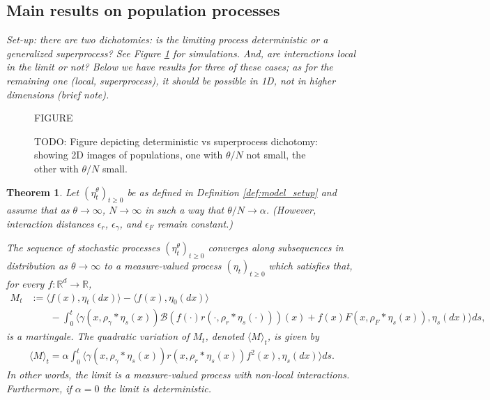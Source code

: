 \documentclass[12pt]{article}
\newtheorem{theorem}{Theorem}[section]
\newcommand{\kernel}{\rho}  %
\newcommand{\smooth}[1]{\kernel_{#1} \! * \!}  %
\newcommand{\comment}[1]{{\color{blue} \it #1}}
\begin{document}
\subsection{Main results on population processes}

\comment{
Set-up: there are two dichotomies:
is the limiting process deterministic or a generalized superprocess?
See Figure \ref{fig:super_vs_det_2d} for simulations.
And, are interactions local in the limit or not?
Below we have results for three of these cases;
as for the remaining one (local, superprocess),
it should be possible in 1D, not in higher dimensions (brief note).
}


\begin{figure}
    \begin{center}
        FIGURE
    \end{center}
    \caption{
        TODO: Figure depicting deterministic vs superprocess dichotomy:
        showing 2D images of populations,
        one with $\theta/N$ not small, the other with $\theta/N$ small.
        \label{fig:super_vs_det_2d}
    }
\end{figure}

\begin{theorem} \label{thm:nonlocal_convergence}
    Let $(\eta^\theta_t)_{t \geq 0}$
    be as defined in Definition \ref{def:model_setup}
    and assume that as $\theta \to \infty$, $N \to \infty$
    in such a way that $\theta/N \to \alpha$.
    (However, interaction distances $\epsilon_r$, $\epsilon_\gamma$, and $\epsilon_F$
    remain constant.)

    The sequence of stochastic processes
    $(\eta^\theta_t)_{t \geq 0}$
    converges along subsequences in distribution as $\theta \to \infty$
    to a measure-valued process $(\eta_t)_{t \geq 0}$
    which satisfies that, for every $f:\mathbb{R}^d \rightarrow \mathbb{R}$,
    \begin{align} \label{eqn:mgale_problem}
        M_t
        &:=
        \langle f(x), \eta_t(dx) \rangle
        -
        \langle f(x), \eta_0(dx) \rangle
        \\ & \qquad
        -
        \int_0^t \big\langle
            \gamma(x, \smooth{\gamma} \eta_{s}(x))
            \mathcal{B}\left(
                f(\cdot) r(\cdot, \smooth{r} \eta_{s}(\cdot))
            \right)(x)
            +
            f(x)
            F(x, \smooth{F} \eta_{s}(x)),
            \eta_{s}(dx)
        \big\rangle ds,
    \end{align}
    is a martingale.
    The quadratic variation of $M_t$, denoted $\langle M \rangle_t$, is given by 
    \begin{align} \label{eqn:mgale_variation}
        \langle M \rangle_t
        =
        \alpha
        \int_0^t
        \big\langle
            \gamma\left( x, \smooth{\gamma} \eta_{s}(x) \right)
            r\left(x, \smooth{r} \eta_{s}(x) \right)
            f^2(x),
            \eta_{s} (dx)
        \big\rangle ds. 
    \end{align}
    In other words, the limit is a measure-valued process with non-local interactions.
    Furthermore, if $\alpha = 0$ the limit is deterministic.
\end{theorem}
\end{document}
